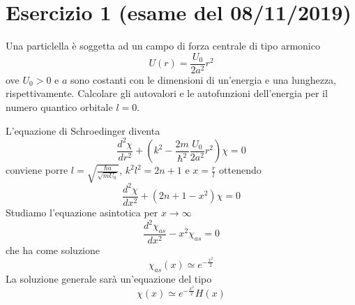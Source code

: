 \documentclass[a4paper]{article}
\begin{document}
    \section*{Esercizio 1 (esame del 08/11/2019)}
        Una particlella è soggetta ad un campo di forza centrale di tipo armonico
        \begin{equation*}
            U(r)=\frac{U_0}{2a^2}r^2
        \end{equation*}
        ove $U_0 > 0$ e $a$ sono costanti con le dimensioni di un'energia e una lunghezza, rispettivamente.
        Calcolare gli autovalori e le autofunzioni dell'energia per il numero quantico orbitale $l = 0$.
        \begin{figure}[H]
            \centering
        \end{figure}
        L'equazione di Schroedinger diventa
        \begin{equation*}
            \frac{d^2\chi}{dr^2}+\left(k^2-\frac{2m}{\hbar^2}\frac{U_0}{2a^2}r^2\right)\chi=0
        \end{equation*}
        conviene porre $l=\sqrt{\frac{\hbar a}{\sqrt{mU_0}}}$, $k^2l^2=2n+1$ e $x=\frac{r}{l}$ ottenendo
        \begin{equation*}
            \frac{d^2\chi}{dx^2}+(2n+1-x^2)\chi=0
        \end{equation*}
        Studiamo l'equazione asintotica per $x\to\infty$
        \begin{equation*}
            \frac{d^2\chi_{as}}{dx^2}-x^2\chi_{as}=0
        \end{equation*}
        che ha come soluzione
        \begin{equation*}
            \chi_{as}(x)\simeq e^{-\frac{x^2}{2}}
        \end{equation*}
        La soluzione generale sarà un'equazione del tipo
        \begin{equation*}
            \chi(x)\simeq e^{-\frac{x^2}{2}}H(x)
        \end{equation*}
\end{document}
